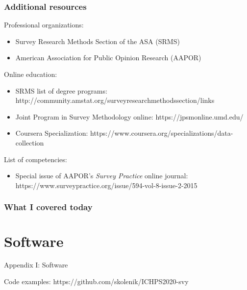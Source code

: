 \documentclass{beamer}
\begin{document}
\begin{frame}\frametitle{Additional resources}

Professional organizations:
\begin{itemize}
    \item Survey Research Methods Section of the ASA (SRMS)
    \item American Association for Public Opinion Research (AAPOR)
\end{itemize}

Online education:
\begin{itemize}
    \item SRMS list of degree programs: http://community.amstat.org/surveyresearchmethodssection/links
    \item Joint Program in Survey Methodology online: https://jpsmonline.umd.edu/
    \item Coursera Specialization: https://www.coursera.org/specializations/data-collection
\end{itemize}

List of competencies:
\begin{itemize}
    \item Special issue of AAPOR's \textit{Survey Practice} online journal: https://www.surveypractice.org/issue/594-vol-8-issue-2-2015
\end{itemize}

\end{frame}

\begin{frame}
    \frametitle{What I covered today}
    \tableofcontents
\end{frame}

\appendix

\section{Software}

\begin{frame}

\centering

{\Large Appendix I: Software}

\bigskip

\bigskip

Code examples: https://github.com/skolenik/ICHPS2020-svy

\end{frame}
\end{document}
